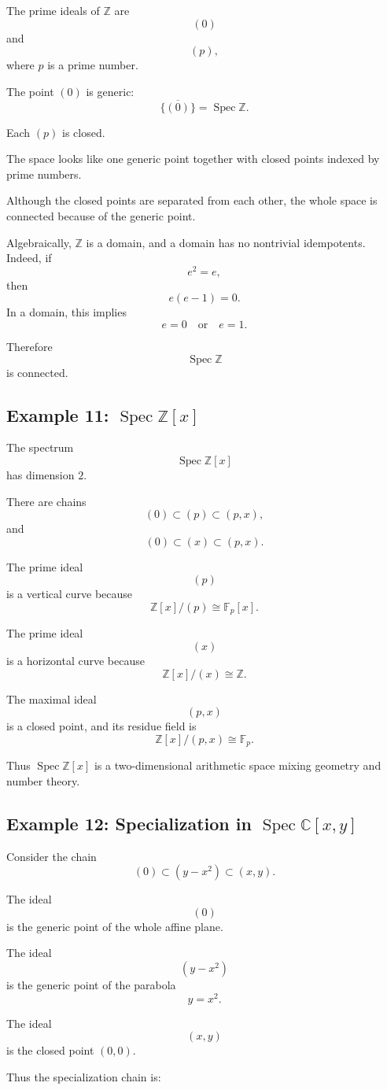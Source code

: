 \documentclass[12pt,a4paper]{article}
\newcommand{\Z}{\mathbb{Z}}
\newcommand{\C}{\mathbb{C}}
\newcommand{\Spec}{\operatorname{Spec}}
\newcommand{\Fp}{\mathbb F_p}
\begin{document}
The prime ideals of \(\Z\) are
\[
(0)
\]
and
\[
(p),
\]
where \(p\) is a prime number.

The point \((0)\) is generic:
\[
\overline{\{(0)\}}=\Spec \Z.
\]

Each \((p)\) is closed.

The space looks like one generic point together with closed points indexed by
prime numbers.

Although the closed points are separated from each other, the whole space is
connected because of the generic point.

Algebraically, \(\Z\) is a domain, and a domain has no nontrivial idempotents.
Indeed, if
\[
e^2=e,
\]
then
\[
e(e-1)=0.
\]
In a domain, this implies
\[
e=0
\quad\text{or}\quad
e=1.
\]

Therefore
\[
\Spec\Z
\]
is connected.

\subsection{Example 11: \(\Spec \Z[x]\)}

The spectrum
\[
\Spec\Z[x]
\]
has dimension \(2\).

There are chains
\[
(0)\subset (p)\subset (p,x),
\]
and
\[
(0)\subset (x)\subset (p,x).
\]

The prime ideal
\[
(p)
\]
is a vertical curve because
\[
\Z[x]/(p)\cong \Fp[x].
\]

The prime ideal
\[
(x)
\]
is a horizontal curve because
\[
\Z[x]/(x)\cong \Z.
\]

The maximal ideal
\[
(p,x)
\]
is a closed point, and its residue field is
\[
\Z[x]/(p,x)\cong \Fp.
\]

Thus \(\Spec\Z[x]\) is a two-dimensional arithmetic space mixing geometry and
number theory.

\subsection{Example 12: Specialization in \(\Spec\C[x,y]\)}

Consider the chain
\[
(0)\subset (y-x^2)\subset (x,y).
\]

The ideal
\[
(0)
\]
is the generic point of the whole affine plane.

The ideal
\[
(y-x^2)
\]
is the generic point of the parabola
\[
y=x^2.
\]

The ideal
\[
(x,y)
\]
is the closed point \((0,0)\).

Thus the specialization chain is:
\end{document}
